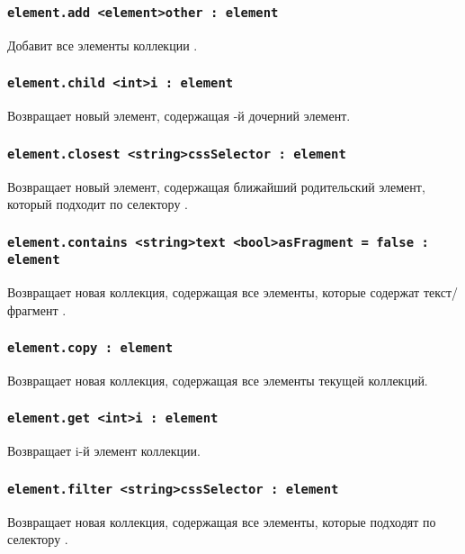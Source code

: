\documentclass[a4paper, 14pt]{extarticle}
\begin{document}
\subsubsection{\lstinline|element.add <element>other : element|}

Добавит все элементы коллекции .

\subsubsection{\lstinline|element.child <int>i : element|}

Возвращает новый элемент, содержащая -й дочерний элемент.

\subsubsection{\lstinline|element.closest <string>cssSelector : element|}

Возвращает новый элемент, содержащая ближайший родительский элемент, который подходит по селектору .

\subsubsection{\lstinline|element.contains <string>text <bool>asFragment = false : element|}

Возвращает новая коллекция, содержащая все элементы, которые содержат текст/фрагмент .

\subsubsection{\lstinline|element.copy : element|}

Возвращает новая коллекция, содержащая все элементы текущей коллекций.

\subsubsection{\lstinline|element.get <int>i : element|}

Возвращает i-й элемент коллекции.

\subsubsection{\lstinline|element.filter <string>cssSelector : element|}

Возвращает новая коллекция, содержащая все элементы, которые подходят по селектору .
\end{document}
